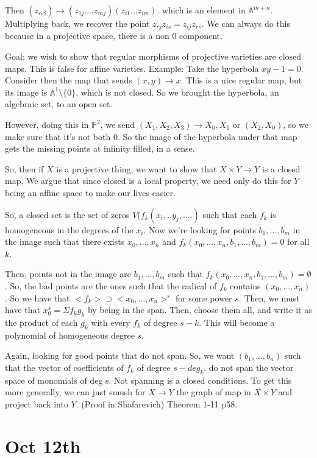 \documentclass[10pt]{article}
\begin{document}
Then $(z_{\alpha\beta}) \to (z_{1j}....z_{mj})(z_{i1}...z_{im})$. which is an element in $\mathbb{A}^{m+n}$. Multiplying back, we recover the point $z_{rj} z_{is} = z_{ij} z_{rs}$. We can always do this because in a projective space, there is a non 0 component.

Goal: we wish to show that regular morphisms of projective varieties are closed maps. This is false for affine varieties. Example: Take the hyperbola $xy - 1 = 0$. Consider then the map that sends $(x,y) \to x$. This is a nice regular map, but its image is $\mathbb{A}^1 \setminus \{ 0 \}$, which is not closed. So we brought the hyperbola, an algebraic set, to an open set.

However, doing this in $\mathbb{P}^2$, we send $(X_1,X_2,X_3) \to X_0,X_1$ or $(X_2,X_0)$, so we make sure that it’s not both $0$. So the image of the hyperbola under that map gets the missing points at infinity filled, in a sense.

So, then if $X$ is a projective thing, we want to show that $X \times Y \to Y$ is a closed map. We argue that since closed is a local property, we need only do this for $Y$ being an affine space to make our lives easier.

So, a closed set is the set of zeros $V(f_k(x_i,..y_j,....)$ such that each $f_k$ is homogeneous in the degrees of the $x_i$. Now we’re looking for points $b_1,...,b_m$ in the image such that there exists $x_0,...,x_n$ and $f_k(x_0,...,x_n, b_1,...,b_m) = 0$ for all $k$.

Then, points not in the image are $b_1,...,b_m$ such that $f_k(x_0,...,x_n, b_1,...,b_m) = \emptyset$. So, the bad points are the ones such that the radical of $f_k$ contains $(x_0,...,x_n)$. So we have that $< f_k > \supset <x_0,...,x_n>^s$ for some power $s$. Then, we must have that $x_0^s = \Sigma f_k g_k$ by being in the span. Then, choose them all, and write it as the product of each $g_k$ with every $f_k$ of degree $s-k$. This will become a polynomial of homogeneous degree $s$.

Again, looking for good points that do not span.  So, we want $(b_1,...,b_n)$ such that the vector of coefficients of $f_k$ of degree $s - deg_k$. do not span the vector space of monomials of deg s. Not spanning is a closed conditions. To get this more generally, we can just smush for $X \to Y$ the graph of map in $X \times Y$ and project back into $Y$. (Proof in Shafarevich) Theorem 1-11 p58.

\section{Oct 12th}
\end{document}
